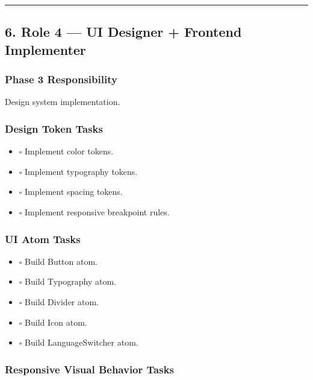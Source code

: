 \documentclass[12pt,a4paper]{article}
\providecommand{\tightlist}{\setlength{\itemsep}{0pt}\setlength{\parskip}{0pt}}
\begin{document}
\begin{center}\rule{0.5\linewidth}{0.5pt}\end{center}

\subsection{6. Role 4 --- UI Designer + Frontend Implementer}\label{role-4-ui-designer-frontend-implementer}

\subsubsection{Phase 3 Responsibility}\label{phase-3-responsibility-2}

Design system implementation.

\subsubsection{Design Token Tasks}\label{design-token-tasks}

\begin{itemize}
\tightlist
\item
  \(\square\) Implement color tokens.
\item
  \(\square\) Implement typography tokens.
\item
  \(\square\) Implement spacing tokens.
\item
  \(\square\) Implement responsive breakpoint rules.
\end{itemize}

\subsubsection{UI Atom Tasks}\label{ui-atom-tasks}

\begin{itemize}
\tightlist
\item
  \(\square\) Build Button atom.
\item
  \(\square\) Build Typography atom.
\item
  \(\square\) Build Divider atom.
\item
  \(\square\) Build Icon atom.
\item
  \(\square\) Build LanguageSwitcher atom.
\end{itemize}

\subsubsection{Responsive Visual Behavior Tasks}\label{responsive-visual-behavior-tasks}
\end{document}
